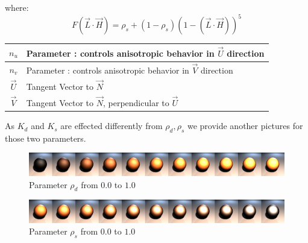 \documentclass[11pt,a4paper]{article}
\begin{document}
where:
\begin{equation}
F(\vec{L} \cdot \vec{H}) = \rho_s + (1-\rho_s)(1-(\vec{L} \cdot \vec{H}))^5
\end{equation}

\begin{table}[H]
\begin{tabular}{| c | l |}
\hline
$n_u$ & Parameter : controls anisotropic behavior in $\vec{U}$ direction\\ \hline
$n_v$ & Parameter : controls anisotropic behavior in $\vec{V}$ direction\\ \hline
$\vec{U}$ & Tangent Vector to $\vec{N}$\\ \hline
$\vec{V}$ & Tangent Vector to $\vec{N}$, perpendicular to $\vec{U}$\\ \hline
\end{tabular}
\end{table}

As $K_d$ and $K_s$ are effected differently from $\rho_d , \rho_s$ we provide another pictures for those two parameters.

\begin{figure}[H]

\includegraphics[width=\textwidth]{ashdiffcomplete.png}
\caption{Parameter $\rho_d$ from $0.0$ to $1.0$}
\end{figure}

\begin{figure}[H]

\includegraphics[width=\textwidth]{ashspeccomplete.png}
\caption{Parameter $\rho_s$ from $0.0$ to $1.0$}
\end{figure}
\end{document}
